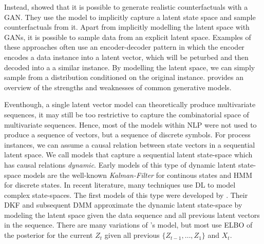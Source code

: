 \documentclass[./../../paper.tex]{subfiles}
\begin{document}
Instead, \citeauthor{robeer_GeneratingRealisticNatural_2021} showed that it is possible to generate realistic counterfactuals with a \gls{GAN}\autocite{robeer_GeneratingRealisticNatural_2021}. They use the model to implicitly capture a latent state space and sample counterfactuals from it. Apart from implicitly modelling the latent space with \glspl{GAN}, it is possible to sample data from an explicit latent space. Examples of these approaches often use an encoder-decoder pattern in which the encoder encodes a data instance into a latent vector, which will be peturbed and then decoded into a a similar instance\autocites{melnyk_ImprovedNeuralText_2017,wang_ControllableUnsupervisedText_2019}. By modelling the latent space, we can simply sample from a distribution conditioned on the original instance. \citeauthor{bond-taylor_DeepGenerativeModelling_2021} provides an overview of the strengths and weaknesses of common generative models.

Eventhough, a single latent vector model can theoretically produce multivariate sequences, it may still be too restrictive to capture the combinatorial space of multivariate sequences. Hence, most of the models within \gls{NLP} were not used to produce a sequence of vectors, but a sequence of discrete symbols. For process instances, we can assume a causal relation between state vectors in a sequential latent space. We call models that capture a sequential latent state-space which has causal relations \emph{dynamic}\autocite{leglaive_RecurrentVariationalAutoencoder_2020}. Early models of this type of dynamic latent state-space models are the well-known \emph{Kalman-Filter} for continous states and \gls{HMM} for discrete states. In recent literature, many techniques use \gls{DL} to model complex state-spaces. The first models of this type were developed by \citeauthor{krishnan_StructuredInferenceNetworks_2017}\autocite{krause_InteractingPredictionsVisual_2016, krishnan_StructuredInferenceNetworks_2017}. Their \gls{DKF} and subsequent \gls{DMM} approximate the dynamic latent state-space by modeling the latent space given the data sequence and all previous latent vectors in the sequence. There are many variations\autocites{chung_RecurrentLatentVariable_2016,fraccaro_Sequentialneuralmodels_2016,leglaive_RecurrentVariationalAutoencoder_2020} of \citeauthor{krishnan_StructuredInferenceNetworks_2017}'s model, but most use \gls{ELBO} of the posterior for the current $Z_{t}$ given all previous $\{Z_{t-1},\ldots,Z_{1}\}$ and $X_{t}$\autocite{girin_DynamicalVariationalAutoencoders_2021}.
\end{document}
